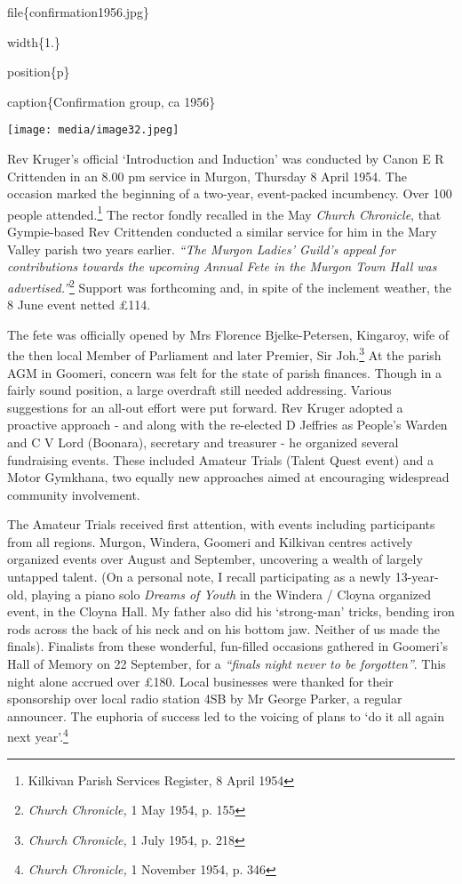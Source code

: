 file\{confirmation1956.jpg\}

width\{1.\}

position\{p\}

caption\{Confirmation group, ca 1956\}

\texttt{[image: media/image32.jpeg]}

Rev Kruger's official `Introduction and Induction' was conducted by Canon E R Crittenden in an 8.00 pm service in Murgon, Thursday 8 April 1954. The occasion marked the beginning of a two-year, event-packed incumbency. Over 100 people attended.\footnote{Kilkivan Parish Services Register, 8 April 1954} The rector fondly recalled in the May \emph{Church Chronicle}, that Gympie-based Rev Crittenden conducted a similar service for him in the Mary Valley parish two years earlier. \emph{``The Murgon Ladies' Guild's appeal for contributions towards the upcoming Annual Fete in the Murgon Town Hall was advertised.''}\footnote{\emph{Church Chronicle,} 1 May 1954, p. 155} Support was forthcoming and, in spite of the inclement weather, the 8 June event netted £114.

The fete was officially opened by Mrs Florence Bjelke-Petersen, Kingaroy, wife of the then local Member of Parliament and later Premier, Sir Joh.\footnote{\emph{Church Chronicle,} 1 July 1954, p. 218} At the parish AGM in Goomeri, concern was felt for the state of parish finances. Though in a fairly sound position, a large overdraft still needed addressing. Various suggestions for an all-out effort were put forward. Rev Kruger adopted a proactive approach - and along with the re-elected D Jeffries as People's Warden and C V Lord (Boonara), secretary and treasurer - he organized several fundraising events. These included Amateur Trials (Talent Quest event) and a Motor Gymkhana, two equally new approaches aimed at encouraging widespread community involvement.

The Amateur Trials received first attention, with events including participants from all regions. Murgon, Windera, Goomeri and Kilkivan centres actively organized events over August and September, uncovering a wealth of largely untapped talent. (On a personal note, I recall participating as a newly 13-year-old, playing a piano solo \emph{Dreams of Youth} in the Windera / Cloyna organized event, in the Cloyna Hall. My father also did his `strong-man' tricks, bending iron rods across the back of his neck and on his bottom jaw. Neither of us made the finals). Finalists from these wonderful, fun-filled occasions gathered in Goomeri's Hall of Memory on 22 September, for a \emph{``finals night never to be forgotten''}. This night alone accrued over £180. Local businesses were thanked for their sponsorship over local radio station 4SB by Mr George Parker, a regular announcer. The euphoria of success led to the voicing of plans to `do it all again next year'.\footnote{\emph{Church Chronicle,} 1 November 1954, p. 346}

